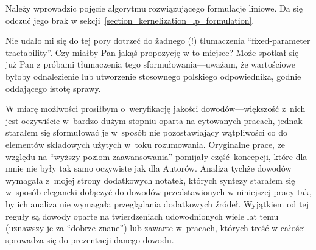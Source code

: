 \begin{note}
  Należy wprowadzic pojęcie algorytmu rozwiązującego formulacje liniowe. 
  Da się odczuć jego brak w sekcji~\ref{section_kernelization_lp_formulation}.
\end{note}
\begin{note}
  Nie udało mi się do tej pory dotrzeć do żadnego (!) tłumaczenia
  ``fixed-parameter tractability''.
  Czy miałby Pan jakąś propozycję w to miejsce?
  Może spotkał się już Pan z próbami tłumaczenia tego sformułowania---uważam, że
  wartościowe byłoby odnalezienie lub utworzenie stosownego polskiego
  odpowiednika, godnie oddającego istotę sprawy. 
\end{note}
\begin{note}
  W miarę możlwości prosiłbym o~weryfikację jakości dowodów---większość z~nich
  jest oczywiście w~bardzo dużym stopniu oparta na cytowanych pracach, jednak
  starałem się sformułować je w~sposób nie pozostawiający wątpliwości co do
  elementów składowych użytych w~toku rozumowania.
  Oryginalne prace, ze względu na ``wyższy poziom zaawansowania'' pomijały
  część~koncepcji, które dla mnie nie były tak samo oczywiste jak dla Autorów.
  Analiza tychże dowodów wymagała z~mojej strony dodatkowych notatek, których
  syntezy starałem się w~sposób elegancki dołączyć do dowodów przedstawionych w
  niniejszej pracy tak, by ich analiza nie wymagała przeglądania dodatkowych
  źródeł.
  Wyjątkiem od tej reguły są dowody oparte na twierdzeniach udowodnionych wiele
  lat temu (uznawszy je za ``dobrze znane'') lub zawarte w~pracach, których 
  treść w całości sprowadza się do prezentacji danego dowodu.
\end{note}

